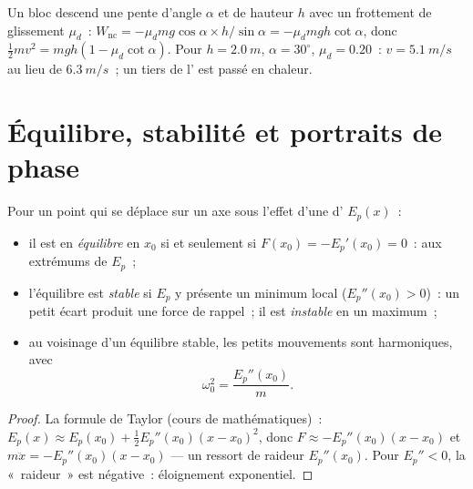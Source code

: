 \begin{example}\label{ex:b1:work-and-energy:friction}
Un bloc descend une pente d'angle $\alpha$ et de hauteur $h$ avec un
frottement de glissement $\mu_d$~: $W_{\text{nc}} = -\mu_dmg\cos\alpha \times
h/\sin\alpha = -\mu_dmgh\cot\alpha$, donc $\tfrac12 mv^2 = mgh(1 - \mu_d\cot\alpha)$.
Pour $h = \qty{2.0}{m}$, $\alpha = 30^\circ$, $\mu_d = 0.20$~: $v =
\qty{5.1}{m/s}$ au lieu de $\qty{6.3}{m/s}$~; un tiers de l' est passé en chaleur.
\end{example}

\section{Équilibre, stabilité et portraits de phase}

\begin{proposition}\label{prop:b1:work-and-energy:stability}
Pour un point qui se déplace sur un axe sous l'effet d'une  d' $E_p(x)$~:
\begin{itemize}
  \item il est en \emph{équilibre} en $x_0$ si et seulement si
        $F(x_0) = -E_p'(x_0) = 0$~: aux extrémums de $E_p$~;
  \item l'équilibre est \emph{stable} si $E_p$ y présente un minimum
        local ($E_p''(x_0) > 0$)~: un petit écart produit une force de
        rappel~; il est \emph{instable} en un maximum~;
  \item au voisinage d'un équilibre stable, les petits mouvements sont
        harmoniques, avec
        \[
        \omega_0^2 = \frac{E_p''(x_0)}{m} .
        \]
\end{itemize}
\end{proposition}

\begin{proof}
La formule de Taylor (cours de mathématiques)~: $E_p(x) \approx E_p(x_0) +
\tfrac12 E_p''(x_0)(x - x_0)^2$, donc $F \approx -E_p''(x_0)(x - x_0)$ et
$m\ddot x = -E_p''(x_0)(x - x_0)$ --- un ressort de raideur $E_p''(x_0)$.
Pour $E_p'' < 0$, la «~raideur~» est négative~: éloignement exponentiel.
\end{proof}

